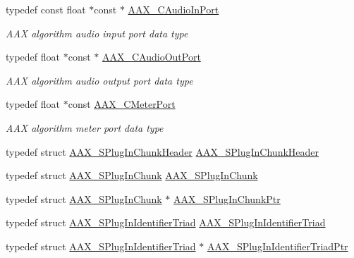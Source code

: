 \begin{DoxyCompactItemize}
typedef const float $\ast$const $\ast$ \hyperlink{a00149_a901605fce9f6c52b770f95916a5db4cf}{A\+A\+X\+\_\+\+C\+Audio\+In\+Port}
\begin{DoxyCompactList}\small\item\em A\+A\+X algorithm audio input port data type \end{DoxyCompactList}\item 
typedef float $\ast$const $\ast$ \hyperlink{a00149_a650727644637144afc13344e7996c947}{A\+A\+X\+\_\+\+C\+Audio\+Out\+Port}
\begin{DoxyCompactList}\small\item\em A\+A\+X algorithm audio output port data type \end{DoxyCompactList}\item 
typedef float $\ast$const \hyperlink{a00149_aa6f40c5c3f36ede060fca61535ea8464}{A\+A\+X\+\_\+\+C\+Meter\+Port}
\begin{DoxyCompactList}\small\item\em A\+A\+X algorithm meter port data type \end{DoxyCompactList}\item 
typedef struct \hyperlink{a00126}{A\+A\+X\+\_\+\+S\+Plug\+In\+Chunk\+Header} \hyperlink{a00149_a5a7e5322afe0c3b98da933557ae0cbba}{A\+A\+X\+\_\+\+S\+Plug\+In\+Chunk\+Header}
\item 
typedef struct \hyperlink{a00125}{A\+A\+X\+\_\+\+S\+Plug\+In\+Chunk} \hyperlink{a00149_af52a5fe2ae79f803234d089889b7e481}{A\+A\+X\+\_\+\+S\+Plug\+In\+Chunk}
\item 
typedef struct \hyperlink{a00125}{A\+A\+X\+\_\+\+S\+Plug\+In\+Chunk} $\ast$ \hyperlink{a00149_ab215ba217e7d757be9ef167dfd8fa23a}{A\+A\+X\+\_\+\+S\+Plug\+In\+Chunk\+Ptr}
\item 
typedef struct \hyperlink{a00127}{A\+A\+X\+\_\+\+S\+Plug\+In\+Identifier\+Triad} \hyperlink{a00149_aa20951c2f27c7f5ff8ea4f92a893e29c}{A\+A\+X\+\_\+\+S\+Plug\+In\+Identifier\+Triad}
\item 
typedef struct \hyperlink{a00127}{A\+A\+X\+\_\+\+S\+Plug\+In\+Identifier\+Triad} $\ast$ \hyperlink{a00149_af0e64ac48db3c92acf98646b97a69f88}{A\+A\+X\+\_\+\+S\+Plug\+In\+Identifier\+Triad\+Ptr}
\end{DoxyCompactItemize}
